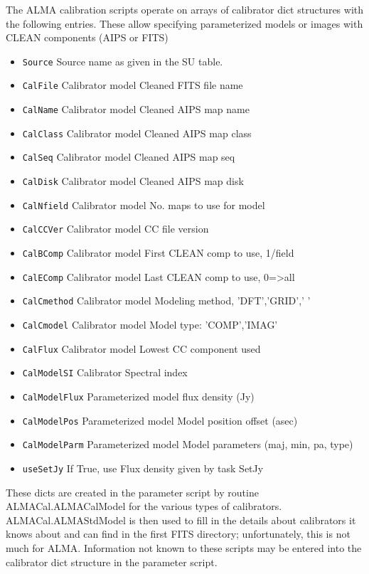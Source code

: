 \documentclass[11pt]{article}
\begin{document}
The ALMA calibration scripts operate on arrays of calibrator dict
structures with the following entries.
These allow specifying parameterized models or images with CLEAN
components (AIPS or FITS)
\begin{itemize}
\item{\tt  Source}       Source name as given in the SU table. 
\item{\tt  CalFile}      Calibrator model Cleaned FITS file name
\item{\tt  CalName}      Calibrator model Cleaned AIPS  map name 
\item{\tt  CalClass}     Calibrator model Cleaned AIPS  map class
\item{\tt  CalSeq}       Calibrator model Cleaned AIPS  map seq
\item{\tt  CalDisk}      Calibrator model Cleaned AIPS  map disk
\item{\tt  CalNfield}    Calibrator model No. maps to use for model
\item{\tt  CalCCVer}     Calibrator model CC file version
\item{\tt  CalBComp}     Calibrator model First CLEAN comp to use, 1/field
\item{\tt  CalEComp}     Calibrator model Last CLEAN comp to use, 0=>all
\item{\tt  CalCmethod}   Calibrator model Modeling method, 'DFT','GRID','    '
\item{\tt  CalCmodel}    Calibrator model Model type: 'COMP','IMAG'
\item{\tt  CalFlux}      Calibrator model Lowest CC component used
\item{\tt  CalModelSI}   Calibrator Spectral index
\item{\tt  CalModelFlux} Parameterized model flux density (Jy)
\item{\tt  CalModelPos}  Parameterized model Model position offset (asec)
\item{\tt  CalModelParm} Parameterized model Model parameters (maj, min, pa, type)
\item{\tt  useSetJy}     If True, use Flux density given by task SetJy
\end{itemize}
These dicts are created in the parameter script by routine
ALMACal.ALMACalModel for the various types of calibrators.
ALMACal.ALMAStdModel is then used to fill in the details about
calibrators it knows about and can find in the first FITS directory;
unfortunately, this is not much for ALMA.
Information not known to these scripts may be entered into the
calibrator dict structure in the parameter script.
\end{document}
